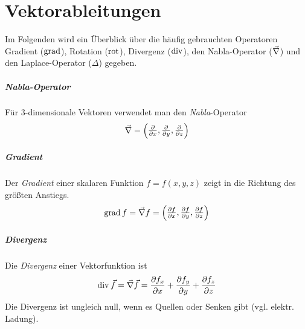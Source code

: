 
\chapter{Vektorableitungen}\label{vektorableitungen}
Im Folgenden wird ein Überblick über die häufig gebrauchten Operatoren 
Gradient ($\Grad$), Rotation ($\Rot$), Divergenz ($\Div$), den Nabla-Operator
($\vecna$) und den Laplace-Operator ($\Delta$) gegeben.

\paragraph*{Nabla-Operator}
Für 3-dimensionale Vektoren verwendet man den 
\emph{Nabla}-Operator%
%
\begin{gather*}
  \vecna = 
  \begin{pmatrix}
    \dif[]{x}, \dif[]{y}, \dif[]{z}
  \end{pmatrix}
\end{gather*}

\paragraph*{Gradient}
Der \emph{Gradient}%
%
einer skalaren Funktion $f=f(x,y,z)$ zeigt in die Richtung des größten Anstiegs.
\begin{gather*}
  \Grad f = \vecna f = 
  \begin{pmatrix}
    \dif[f]{x},\dif[f]{y},\dif[f]{z}
  \end{pmatrix}
\end{gather*}

\paragraph*{Divergenz}
Die \emph{Divergenz}%
%
einer Vektorfunktion ist
\begin{gather*}
  \Div\vec{f} = \vecna\vec{f}
  = \dif[f_{x}]{x}+\dif[f_{y}]{y}+\dif[f_{z}]{z}
\end{gather*}
Die Divergenz ist ungleich null, wenn es Quellen oder Senken gibt
(vgl. elektr. Ladung).

